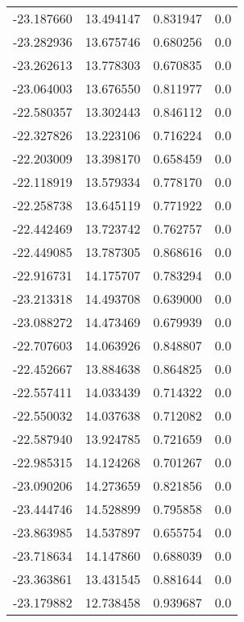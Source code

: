 \begin{tabular}{rrrr}
      -23.187660 &        13.494147 &    0.831947 &   0.0 \\
      -23.282936 &        13.675746 &    0.680256 &   0.0 \\
      -23.262613 &        13.778303 &    0.670835 &   0.0 \\
      -23.064003 &        13.676550 &    0.811977 &   0.0 \\
      -22.580357 &        13.302443 &    0.846112 &   0.0 \\
      -22.327826 &        13.223106 &    0.716224 &   0.0 \\
      -22.203009 &        13.398170 &    0.658459 &   0.0 \\
      -22.118919 &        13.579334 &    0.778170 &   0.0 \\
      -22.258738 &        13.645119 &    0.771922 &   0.0 \\
      -22.442469 &        13.723742 &    0.762757 &   0.0 \\
      -22.449085 &        13.787305 &    0.868616 &   0.0 \\
      -22.916731 &        14.175707 &    0.783294 &   0.0 \\
      -23.213318 &        14.493708 &    0.639000 &   0.0 \\
      -23.088272 &        14.473469 &    0.679939 &   0.0 \\
      -22.707603 &        14.063926 &    0.848807 &   0.0 \\
      -22.452667 &        13.884638 &    0.864825 &   0.0 \\
      -22.557411 &        14.033439 &    0.714322 &   0.0 \\
      -22.550032 &        14.037638 &    0.712082 &   0.0 \\
      -22.587940 &        13.924785 &    0.721659 &   0.0 \\
      -22.985315 &        14.124268 &    0.701267 &   0.0 \\
      -23.090206 &        14.273659 &    0.821856 &   0.0 \\
      -23.444746 &        14.528899 &    0.795858 &   0.0 \\
      -23.863985 &        14.537897 &    0.655754 &   0.0 \\
      -23.718634 &        14.147860 &    0.688039 &   0.0 \\
      -23.363861 &        13.431545 &    0.881644 &   0.0 \\
      -23.179882 &        12.738458 &    0.939687 &   0.0 \\

\end{tabular}

